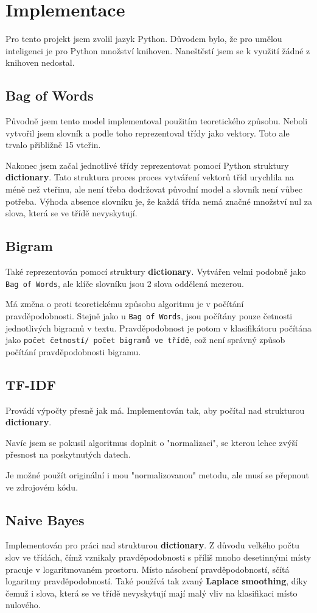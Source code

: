 \documentclass[12pt]{article}
\begin{document}
\section{Implementace}
Pro tento projekt jsem zvolil jazyk Python. Důvodem bylo,
že pro umělou inteligenci je pro Python množství knihoven.
Naneštěstí jsem se k využití žádné z knihoven nedostal.
\subsection{Bag of Words}
Původně jsem tento model implementoval 
použitím teoretického způsobu. Neboli vytvořil jsem 
slovník a podle toho reprezentoval třídy jako vektory.
Toto ale trvalo přibližně 15 vteřin.

Nakonec jsem začal jednotlivé třídy reprezentovat pomocí
Python struktury \textbf{dictionary}. Tato struktura proces
proces vytváření vektorů tříd urychlila na méně než vteřinu,
ale není třeba dodržovat původní model a slovník není vůbec
potřeba. Výhoda absence slovníku je, že každá třída nemá
značné množství nul za slova, která se ve třídě nevyskytují.
\subsection{Bigram}
Také reprezentován pomocí struktury \textbf{dictionary}.
Vytvářen velmi podobně jako \texttt{Bag of Words}, ale 
klíče slovníku jsou 2 slova oddělená mezerou.

Má změna o proti teoretickému způsobu algoritmu je v
počítání pravděpodobnosti. Stejně jako u \texttt{Bag of Words},
jsou počítány pouze četnosti jednotlivých bigramů v textu.
Pravděpodobnost je potom v klasifikátoru počítána jako 
\texttt{počet četností/ počet bigramů ve třídě}, což není
správný způsob počítání pravděpodobnosti bigramu.
\subsection{TF-IDF}
Provádí výpočty přesně jak má. Implementován tak, aby
počítal nad strukturou \textbf{dictionary}.

Navíc jsem se pokusil algoritmus doplnit o "normalizaci",
se kterou lehce zvýší přesnost na poskytnutých datech.

Je možné použít originální i mou "normalizovanou"
metodu, ale musí se přepnout ve zdrojovém kódu.
\subsection{Naive Bayes}
Implementován pro práci nad strukturou \textbf{dictionary}. Z důvodu
velkého počtu slov ve třídách, čímž vznikaly pravděpodobnosti
s příliš mnoho desetinnými místy pracuje v logaritmovaném prostoru.
Místo násobení pravděpodobností, sčítá logaritmy pravděpodobností.
Také používá tak zvaný \textbf{Laplace smoothing}, díky čemuž
i slova, která se ve třídě nevyskytují mají malý vliv na 
klasifikaci místo nulového.
\end{document}
